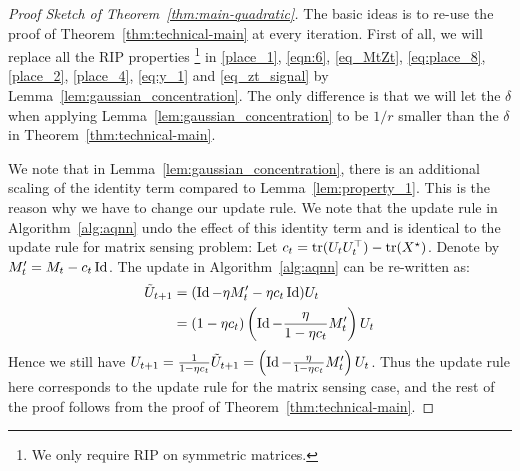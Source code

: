\begin{proof}[Proof Sketch of Theorem~\ref{thm:main-quadratic}]
The basic ideas is to re-use the proof of Theorem~\ref{thm:technical-main} at every iteration.  First of all, we will replace all the RIP properties \footnote{We only require RIP on symmetric matrices.} in \eqref{place_1}, \eqref{eqn:6}, \eqref{eq_MtZt}, \eqref{eq:place_8}, \eqref{place_2}, \eqref{place_4}, \eqref{eq:y_1} and \eqref{eq_zt_signal}  by Lemma~\ref{lem:gaussian_concentration}.  The only difference is that we will let the $\delta$ when applying Lemma~\ref{lem:gaussian_concentration} to be $1/r$ smaller than the $\delta$ in Theorem~\ref{thm:technical-main}.

We note that in Lemma~\ref{lem:gaussian_concentration}, there is an additional scaling of the identity term compared to Lemma~\ref{lem:property_1}. This is the reason why we have to change our update rule.
We note that the update rule in Algorithm~\ref{alg:aqnn} undo the effect of this identity term and is identical to the update rule for matrix sensing problem:
Let $c_t = \textup{tr}(U_t U_t^{\top}) - \textup{tr}({X}^\star)$.
Denote by $M_t' = M_t - c_t \operatorname{Id}$.
The update in Algorithm~\ref{alg:aqnn} can be re-written as:
\begin{align}
\tilde{{U}}_{t + 1} &= (\operatorname{Id} - \eta M'_t - \eta c_t \operatorname{Id} ){U}_t
\\
&= (1 - \eta c_t) \left(\operatorname{Id} - \frac{\eta}{1 - \eta c_t} M'_t \right) {U}_t\nonumber
\end{align}
Hence we still have ${U}_{t + 1} = \frac{1}{1 - \eta c_t} \tilde{{U}}_{t + 1} = \left(\operatorname{Id} - \frac{\eta}{1 - \eta c_t} M'_t \right) {U}_t$. Thus the update rule here corresponds to the update rule for the matrix sensing case, and the rest of the proof follows from the proof of Theorem~\ref{thm:technical-main}.


\end{proof}

